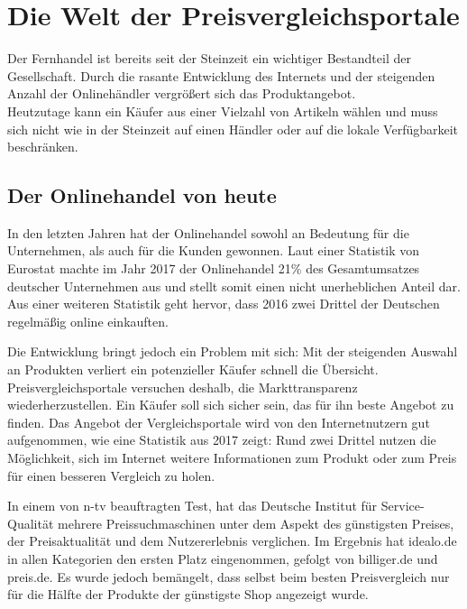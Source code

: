 \section{Die Welt der Preisvergleichsportale}
\label{sec:einleitung}

Der Fernhandel ist bereits seit der Steinzeit ein wichtiger Bestandteil der Gesellschaft.
Durch die rasante Entwicklung des Internets und der steigenden Anzahl der Onlinehändler vergrößert sich das
Produktangebot.\\
Heutzutage kann ein Käufer aus einer Vielzahl von Artikeln wählen und muss sich nicht wie in der Steinzeit auf
einen Händler oder auf die lokale Verfügbarkeit beschränken.

\subsection{Der Onlinehandel von heute}
\label{subsec:onlinehandel-heute}

\begin{comment}
    https://de.statista.com/statistik/studie/id/23510/dokument/e-commerce-in-europa-statista-dossier/
    https://de.statista.com/statistik/studie/id/6558/dokument/produktvergleich-im-internet-statista-dossier/
\end{comment}

In den letzten Jahren hat der Onlinehandel sowohl an Bedeutung für die Unternehmen, als auch für die Kunden gewonnen.
Laut einer Statistik von Eurostat machte im Jahr 2017 der Onlinehandel 21\% des Gesamtumsatzes deutscher Unternehmen
aus und stellt somit einen nicht unerheblichen Anteil dar.
Aus einer weiteren Statistik geht hervor, dass 2016 zwei Drittel der Deutschen regelmäßig online einkauften.

Die Entwicklung bringt jedoch ein Problem mit sich: Mit der steigenden Auswahl an Produkten verliert ein
potenzieller Käufer schnell die Übersicht.
Preisvergleichsportale versuchen deshalb, die Markttransparenz wiederherzustellen.
Ein Käufer soll sich sicher sein, das für ihn beste Angebot zu finden.
Das Angebot der Vergleichsportale wird von den Internetnutzern gut aufgenommen, wie eine Statistik aus 2017 zeigt:
Rund zwei Drittel nutzen die Möglichkeit, sich im Internet weitere Informationen zum Produkt oder zum Preis für einen
besseren Vergleich zu holen.

In einem von n-tv beauftragten Test, hat das Deutsche Institut für Service-Qualität mehrere Preissuchmaschinen unter
dem Aspekt des günstigsten Preises, der Preisaktualität und dem Nutzererlebnis verglichen.
Im Ergebnis hat idealo.de in allen Kategorien den ersten Platz eingenommen, gefolgt von billiger.de und preis.de.
Es wurde jedoch bemängelt, dass selbst beim besten Preisvergleich nur für die Hälfte der Produkte der günstigste
Shop angezeigt wurde.

